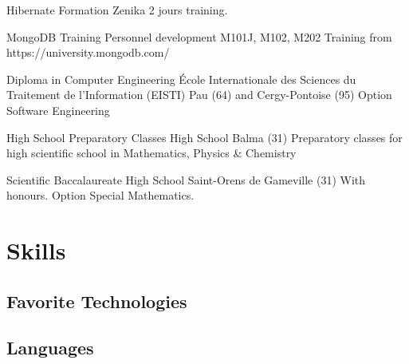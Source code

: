 \documentclass[11pt,a4paper]{moderncv}
\begin{document}
{Hibernate Formation}
{Zenika}
{}
{}
{2 jours training.}

{MongoDB Training}
{Personnel development}
{}
{}
{M101J, M102, M202 Training from https://university.mongodb.com/}

{Diploma in Computer Engineering}
{\'Ecole Internationale des Sciences du Traitement de l’Information (EISTI)}
{Pau (64) and Cergy-Pontoise (95)}
{}
{Option Software Engineering}

{High School Preparatory Classes}
{High School}
{Balma (31)}
{}
{Preparatory classes for high scientific school in Mathematics, Physics \& Chemistry}

{Scientific Baccalaureate}
{High School}
{Saint-Orens de Gameville (31)}
{With honours.}
{Option Special Mathematics.}

\section{Skills}

\subsection{Favorite Technologies}

\subsection{Languages}


\end{document}
